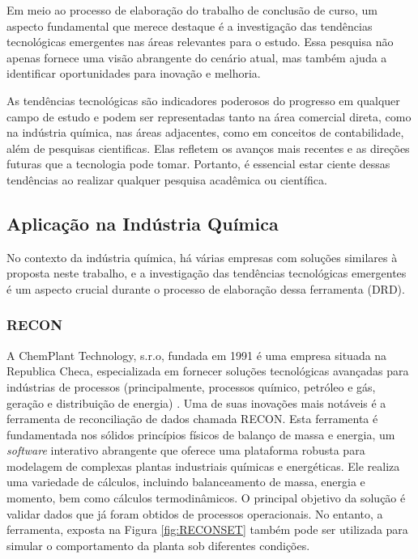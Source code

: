 Em meio ao processo de elaboração do trabalho de conclusão de curso, um aspecto fundamental que merece destaque é a investigação das tendências tecnológicas emergentes nas áreas relevantes para o estudo. Essa pesquisa não apenas fornece uma visão abrangente do cenário atual, mas também ajuda a identificar oportunidades para inovação e melhoria.

As tendências tecnológicas são indicadores poderosos do progresso em qualquer campo de estudo e podem ser representadas tanto na área comercial direta, como na indústria química, nas áreas adjacentes, como em conceitos de contabilidade, além de pesquisas cientificas. Elas refletem os avanços mais recentes e as direções futuras que a tecnologia pode tomar. Portanto, é essencial estar ciente dessas tendências ao realizar qualquer pesquisa acadêmica ou científica.

\subsection{Aplicação na Indústria Química}

No contexto da indústria química, há várias empresas com soluções similares à proposta neste trabalho, e a investigação das tendências tecnológicas emergentes é um aspecto crucial durante o processo de elaboração dessa ferramenta (DRD). 

\subsubsection{RECON}

A ChemPlant Technology, s.r.o, fundada em 1991 é uma empresa situada na Republica Checa, especializada em fornecer soluções tecnológicas avançadas para indústrias de processos (principalmente, processos químico, petróleo e gás, geração e distribuição de energia) \cite{reconset}. Uma de suas inovações mais notáveis é a ferramenta de reconciliação de dados chamada RECON. Esta ferramenta é fundamentada nos sólidos princípios físicos de balanço de massa e energia, um \textit{software} interativo abrangente que oferece uma plataforma robusta para modelagem de complexas plantas industriais químicas e energéticas. Ele realiza uma variedade de cálculos, incluindo balanceamento de massa, energia e momento, bem como cálculos termodinâmicos. O principal objetivo da solução é validar dados que já foram obtidos de processos operacionais. No entanto, a ferramenta, exposta na Figura \ref{fig:RECONSET} também pode ser utilizada para simular o comportamento da planta sob diferentes condições.

